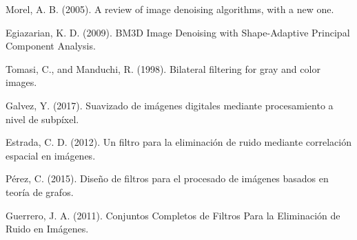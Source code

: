 \documentclass[a4paper,10pt,twocolumn]{article}
\begin{document}



\begin{thebibliography}{99}
	
	 Morel, A. B. (2005). A review of image denoising algorithms, with a new one.

	 Egiazarian, K. D. (2009). BM3D Image Denoising with Shape-Adaptive Principal Component Analysis.

	 Tomasi, C., and Manduchi, R. (1998). Bilateral filtering for gray and color images.

	 Galvez, Y. (2017). Suavizado de imágenes digitales mediante procesamiento a nivel de subpíxel.

	 Estrada, C. D. (2012). Un filtro para la eliminación de ruido mediante correlación espacial en imágenes.

	 Pérez, C. (2015). Diseño de filtros para el procesado de imágenes basados en teoría de grafos.
	
	 Guerrero, J. A. (2011). Conjuntos Completos de Filtros Para la Eliminación de Ruido en Imágenes.

\end{thebibliography}

\label{end}
\end{document}
